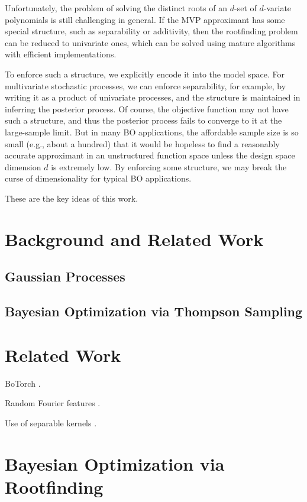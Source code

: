 \documentclass{article}
\begin{document}
Unfortunately, the problem of solving the distinct roots of an $d$-set
of $d$-variate polynomials is still challenging in general. If the MVP
approximant has some special structure, such as separability or
additivity, then the rootfinding problem can be reduced to univariate
ones, which can be solved using mature algorithms with efficient
implementations.

To enforce such a structure, we explicitly encode it into the model
space. For multivariate stochastic processes, we can enforce
separability, for example, by writing it as a product of univariate
processes, and the structure is maintained in inferring the posterior
process. Of course, the objective function may not have such a
structure, and thus the posterior process fails to converge to it at the
large-sample limit. But in many BO applications, the affordable sample
size is so small (e.g., about a hundred) that it would be hopeless to
find a reasonably accurate approximant in an unstructured function space
unless the design space dimension $d$ is extremely low. By enforcing
some structure, we may break the curse of dimensionality for typical BO
applications.

These are the key ideas of this work.

\section{Background and Related Work}

\subsection{Gaussian Processes}

\subsection{Bayesian Optimization via Thompson Sampling}



\section{Related Work}

BoTorch \cite{Balandat2020}.

Random Fourier features \cite{Rahimi2007}.

Use of separable kernels \cite{Stegle2011,Hensman2018}.

\section{Bayesian Optimization via Rootfinding}
\end{document}
